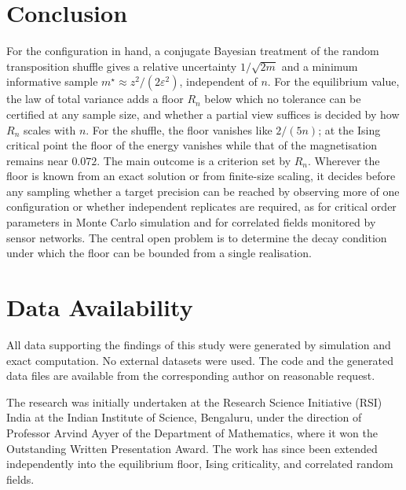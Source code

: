 \documentclass[ba]{imsart}
\theoremstyle{plain}
\theoremstyle{definition}
\begin{document}
\section{Conclusion}\label{sec:conclusion}

For the configuration in hand, a conjugate Bayesian treatment of the random transposition shuffle gives a relative uncertainty $1/\sqrt{2m}$ and a minimum informative sample $m^\star\approx z^2/(2\varepsilon^2)$, independent of $n$. For the equilibrium value, the law of total variance adds a floor $R_n$ below which no tolerance can be certified at any sample size, and whether a partial view suffices is decided by how $R_n$ scales with $n$. For the shuffle, the floor vanishes like $2/(5n)$; at the Ising critical point the floor of the energy vanishes while that of the magnetisation remains near $0.072$. The main outcome is a criterion set by $R_n$. Wherever the floor is known from an exact solution or from finite-size scaling, it decides before any sampling whether a target precision can be reached by observing more of one configuration or whether independent replicates are required, as for critical order parameters in Monte Carlo simulation and for correlated fields monitored by sensor networks. The central open problem is to determine the decay condition under which the floor can be bounded from a single realisation.


\section*{Data Availability}
All data supporting the findings of this study were generated by
simulation and exact computation. No external datasets were used.
The code and the generated data files are available from the
corresponding author on reasonable request.

\begin{acks}[Acknowledgments]
The research was initially undertaken at the Research Science Initiative (RSI) India at the Indian Institute of Science, Bengaluru, under the direction of Professor Arvind Ayyer of the Department of Mathematics, where it won the Outstanding Written Presentation Award. The work has since been extended independently into the equilibrium floor, Ising criticality, and correlated random fields.
\end{acks}



\end{document}
